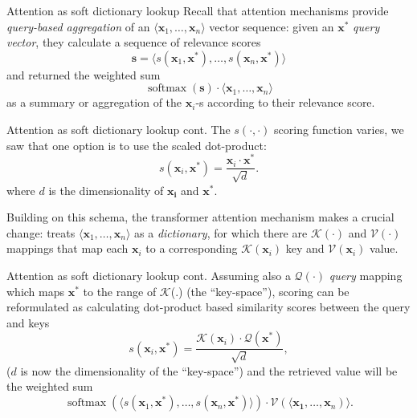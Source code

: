\documentclass[style=upen, size=14pt]{powerdot}
\DeclareMathOperator*{\softmax}{softmax}
\newcommand{\gold}{\color{arany}}
\theoremstyle{definition}
\begin{document}
\begin{slide}[toc=KV-attention]{Attention as soft dictionary lookup}
  Recall that attention mechanisms provide \emph{query-based aggregation} of an
  $\langle \mathbf{x}_1,\dots, \mathbf{x}_n\rangle $ vector sequence: given an
  $\mathbf{x^*}$ \emph{query vector}, they calculate a sequence of relevance
  scores
  $$
  \mathbf{s} = \langle s(\mathbf{x}_1, \mathbf{x}^*),\dots, s(\mathbf{x}_n,
  \mathbf{x}^*) \rangle
  $$
  and returned the weighted sum 
  $$
  \softmax (\mathbf{s})\cdot \langle \mathbf{x}_1,\dots, \mathbf{x}_n\rangle 
  $$
  as a summary or aggregation of the $\mathbf{x}_i$-s according to their
  relevance score.
\end{slide}

\begin{slide}[toc=]{Attention as soft dictionary lookup cont.}
  The $s(\cdot, \cdot)$ scoring function varies, we saw that one option is to
  use the scaled dot-product:
  $$
  s(\mathbf{x}_i, \mathbf{x}^*) = \frac{\mathbf{x}_i\cdot
    \mathbf{x}^*}{\sqrt{d}}.
  $$
  where $d$ is the dimensionality of $\mathbf{x_i}$ and $\mathbf{x^*}$.\bigskip

  Building on this schema, the transformer attention mechanism makes a crucial
  change: treats $\langle \mathbf{x}_1,\dots, \mathbf{x}_n\rangle$ as a
  \emph{\gold dictionary}, for which there are $\mathcal K(\cdot)$ and $\mathcal V(\cdot)$
  mappings that map each $\mathbf{x}_i$ to a corresponding
  $\mathcal K(\mathbf{x}_i)$ key and $\mathcal V(\mathbf{x}_i)$ value.
\end{slide}


\begin{slide}[toc=]{Attention as soft dictionary lookup cont.}
  Assuming also a $\mathcal Q(\cdot)$ \emph{\gold query} mapping which maps
  $\mathbf{x}^*$ to the range of $\mathcal K$(.) (the ``key-space''), scoring
  can be reformulated as calculating dot-product based similarity scores between
  the query and keys
  $$
  s(\mathbf{x}_i, \mathbf{x}^*) = \frac{\mathcal K (\mathbf{x}_i)\cdot
    \mathcal Q (\mathbf{x}^*)}{\sqrt{d}},
  $$
  ($d$ is now the dimensionality of the ``key-space'') and the retrieved value
  will be the weighted sum
  $$
  \softmax(\langle
  s(\mathbf{x}_1,\mathbf{x}^*),\dots,s(\mathbf{x}_n,\mathbf{x}^*) \rangle)\cdot
  \mathcal V(\langle \mathbf{x_1},\dots,\mathbf{x}_n)\rangle.
  $$
\end{slide}
\end{document}
